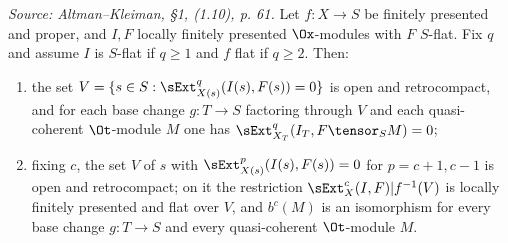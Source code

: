 \begin{theorem}
  \label{thm:ext_finite_flat}
  \textit{Source: Altman--Kleiman, §1, (1.10), p. 61.}
  Let $f : X \to S$ be finitely presented and proper, and $I, F$ locally finitely
  presented $\Ox$-modules with $F$ $S$-flat. Fix $q$ and assume $I$ is $S$-flat if
  $q \geq 1$ and $f$ flat if $q \geq 2$. Then:
  \begin{enumerate}
    \item[(i)] the set $V = \{ s \in S : \sExt^q_{X(s)}(I(s),F(s)) = 0 \}$ is open
      and retrocompact, and for each base change $g : T \to S$ factoring through
      $V$ and each quasi-coherent $\Ot$-module $M$ one has
      $\sExt^q_{X_T}(I_T, F \tensor_S M) = 0$;
    \item[(ii)] fixing $c$, the set $V$ of $s$ with
      $\sExt^p_{X(s)}(I(s),F(s)) = 0$ for $p = c+1, c-1$ is open and retrocompact;
      on it the restriction $\sExt^c_X(I,F)|f^{-1}(V)$ is locally finitely
      presented and flat over $V$, and $b^c(M)$ is an isomorphism for every base
      change $g : T \to S$ and every quasi-coherent $\Ot$-module $M$.
  \end{enumerate}

\end{theorem}
